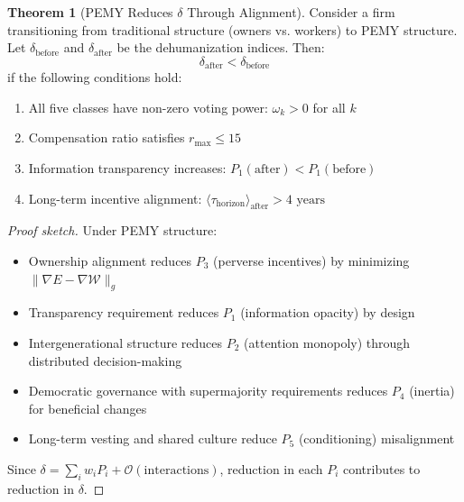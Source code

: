 \documentclass[11pt,a4paper]{article}
\theoremstyle{definition}
\newtheorem{theorem}{Theorem}[section]
\theoremstyle{remark}
\begin{document}
\begin{theorem}[PEMY Reduces $\delta$ Through Alignment]
Consider a firm transitioning from traditional structure (owners vs. workers) to PEMY structure. Let $\delta_{\text{before}}$ and $\delta_{\text{after}}$ be the dehumanization indices. Then:
\[
\delta_{\text{after}} < \delta_{\text{before}}
\]
if the following conditions hold:
\begin{enumerate}[leftmargin=1.5em]
    \item All five classes have non-zero voting power: $\omega_k > 0$ for all $k$
    \item Compensation ratio satisfies $r_{\max} \leq 15$
    \item Information transparency increases: $P_1(\text{after}) < P_1(\text{before})$
    \item Long-term incentive alignment: $\langle \tau_{\text{horizon}} \rangle_{\text{after}} > 4 \text{ years}$
\end{enumerate}
\end{theorem}

\begin{proof}[Proof sketch]
Under PEMY structure:
\begin{itemize}[leftmargin=1.5em]
    \item Ownership alignment reduces $P_3$ (perverse incentives) by minimizing $\|\nabla E - \nabla \mathcal{W}\|_g$
    \item Transparency requirement reduces $P_1$ (information opacity) by design
    \item Intergenerational structure reduces $P_2$ (attention monopoly) through distributed decision-making
    \item Democratic governance with supermajority requirements reduces $P_4$ (inertia) for beneficial changes
    \item Long-term vesting and shared culture reduce $P_5$ (conditioning) misalignment
\end{itemize}
Since $\delta = \sum_i w_i P_i + \mathcal{O}(\text{interactions})$, reduction in each $P_i$ contributes to reduction in $\delta$.
\end{proof}
\end{document}
